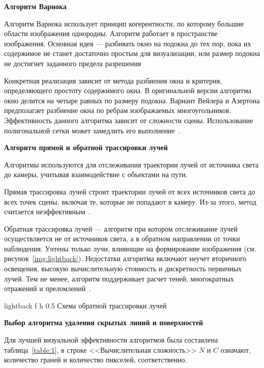 \fi

\textbf{Алгоритм Варнока}

Алгоритм Варнока использует принцип когерентности, по которому большие области изображения однородны.
Алгоритм работает в пространстве изображения.
Основная идея --- разбивать окно на подокна до тех пор, пока их содержимое не станет достаточно простым для визуализации, или размер подокна не достигнет заданного предела разрешения~\cite{del_line, varnok}

Конкретная реализация зависит от метода разбиения окна и критерия, определяющего простоту содержимого окна.
В оригинальной версии алгоритма окно делится на четыре равных по размеру подокна.
Вариант Вейлера и Азертона предполагает разбиение окна по ребрам изображаемых многоугольников. Эффективность данного алгоритма зависит от сложности сцены. Использование полигональной сетки может замедлить его выполнение~\cite{varnok}.


\textbf{Алгоритм прямой и обратной трассировки лучей} 

Алгоритмы используются для отслеживания траектории лучей от источника света до камеры, учитывая взаимодействие с объектами на пути. 

Прямая трассировка лучей строит траектории лучей от всех источников света до всех точек сцены, включая те, которые не попадают в камеру. Из-за этого, метод считается неэффективным~\cite{ray_tracing}.

Обратная трассировка лучей --- алгоритм при котором отслеживание лучей осуществляется не от источников света, а в обратном направлении от точки наблюдения. 
Учтены только лучи, влияющие на формирование изображения (см. рисунок~\ref{img:lightback}).
Недостатки алгоритма включают неучет вторичного освещения, высокую вычислительную стоимость и дискретность первичных лучей.
Тем не менее, алгоритм поддерживает расчет теней, многократных отражений и преломлений~\cite{ray_tracing}.

	{lightback} %
	{f} %
	{h} %
	{0.5\textwidth} %
	{Схема обратной трассировки лучей} %

\textbf{Выбор алгоритма удаления скрытых линий и поверхностей}

Для лучшей визуальной эффективности алгоритмов была составлена таблица~\ref{table:1}, в строке <<Вычислительная сложность>> $N$ и $C$ означают, количество граней и количество пикселей, соответственно.

